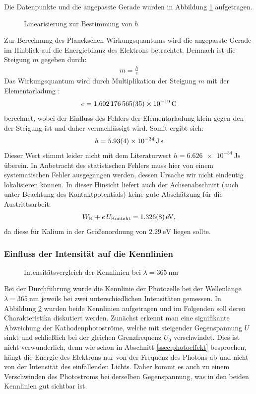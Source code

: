 \documentclass[11pt, a4paper]{article}
\numberwithin{equation}{section}
\begin{document}
Die Datenpunkte und die angepasste Gerade wurden in Abbildung \ref{fig:lin_h} aufgetragen.
\begin{figure}[h]
	\centering
	
	\caption{Linearisierung zur Bestimmung von $h$}
	\label{fig:lin_h}
\end{figure}
Zur Berechnung des Planckschen Wirkungsquantums wird die angepasste Gerade im Hinblick auf die Energiebilanz des Elektrons betrachtet.
Demnach ist die Steigung $m$ gegeben durch:
\begin{align*}
	m = \frac{h}{e}
\end{align*}
Das Wirkungsquantum wird durch Multiplikation der Steigung $m$ mit der Elementarladung \cite{CODATA}:
\begin{align*}
	e = \SI{1.602176565 +- 0.000000035e-19}{\coulomb}
\end{align*}
berechnet, wobei der Einfluss des Fehlers der Elementarladung klein gegen den der Steigung ist und daher vernachlässigt wird.
Somit ergibt sich:
\begin{align*}
	h = \SI{5.93 +- 0.04e-34}{\joule\second}
\end{align*}
Dieser Wert stimmt leider nicht mit dem Literaturwert $h = \SI{6.626 e-34}{\joule\second}$ \cite{CODATA} überein.
In Anbetracht des statistischen Fehlers muss hier von einem systematischen Fehler ausgegangen werden, dessen Ursache wir nicht eindeutig lokalisieren können.
In dieser Hinsicht liefert auch der Achsenabschnitt (auch unter Beachtung des Kontaktpotentials) keine gute Abschätzung für die Austrittsarbeit:
\begin{align*}
	W_\mathrm{K} + e \, U_\mathrm{Kontakt} = \SI{1.326 +- 0.008}{\electronvolt} \text{,}
\end{align*}
da diese für Kalium in der Größenordnung von $\SI{2.29}{\electronvolt}$ \cite{crc} liegen sollte.


\subsubsection{Einfluss der Intensität auf die Kennlinien}
\begin{figure}[h]
	\centering
	
	\caption{Intensitätsvergleich der Kennlinien bei $\lambda = \SI{365}{\nano\metre}$}
	\label{fig:kennlinie_intensitaet}
\end{figure}
Bei der Durchführung wurde die Kennlinie der Photozelle bei der Wellenlänge $\lambda = \SI{365}{\nano\metre}$ jeweils bei zwei unterschiedlichen Intensitäten gemessen.
In Abbildung \ref{fig:kennlinie_intensitaet} wurden beide Kennlinien aufgetragen und im Folgenden soll deren Charakteristika diskutiert werden.
Zunächst erkennt man eine signifikante Abweichung der Kathodenphotoströme, welche mit steigender Gegenspannung $U$ sinkt und schließlich bei der gleichen Grenzfrequenz $U_0$ verschwindet.
Dies ist nicht verwunderlich, denn wie schon in Abschnitt \ref{ssec:photoeffekt} besprochen, hängt die Energie des Elektrons nur von der Frequenz des Photons ab und nicht von der Intensität des einfallenden Lichts.
Daher kommt es auch zu einem Verschwinden des Photostroms bei derselben Gegenspannung, was in den beiden Kennlinien gut sichtbar ist.
\end{document}
